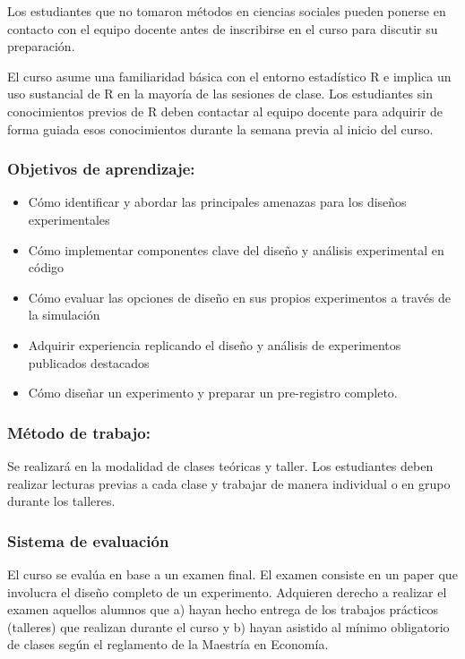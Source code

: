\documentclass[
  12pt,
]{article}
\providecommand{\tightlist}{%
  \setlength{\itemsep}{0pt}\setlength{\parskip}{0pt}}
\begin{document}
Los estudiantes que no tomaron métodos en ciencias sociales pueden
ponerse en contacto con el equipo docente antes de inscribirse en el
curso para discutir su preparación.

El curso asume una familiaridad básica con el entorno estadístico R e
implica un uso sustancial de R en la mayoría de las sesiones de clase.
Los estudiantes sin conocimientos previos de R deben contactar al equipo
docente para adquirir de forma guiada esos conocimientos durante la
semana previa al inicio del curso.

\hypertarget{objetivos-de-aprendizaje}{%
\subsubsection{Objetivos de
aprendizaje:}\label{objetivos-de-aprendizaje}}

\begin{itemize}
\tightlist
\item
  Cómo identificar y abordar las principales amenazas para los diseños
  experimentales
\item
  Cómo implementar componentes clave del diseño y análisis experimental
  en código
\item
  Cómo evaluar las opciones de diseño en sus propios experimentos a
  través de la simulación
\item
  Adquirir experiencia replicando el diseño y análisis de experimentos
  publicados destacados
\item
  Cómo diseñar un experimento y preparar un pre-registro completo.
\end{itemize}

\hypertarget{muxe9todo-de-trabajo}{%
\subsubsection{Método de trabajo:}\label{muxe9todo-de-trabajo}}

Se realizará en la modalidad de clases teóricas y taller. Los
estudiantes deben realizar lecturas previas a cada clase y trabajar de
manera individual o en grupo durante los talleres.

\hypertarget{sistema-de-evaluaciuxf3n}{%
\subsubsection{Sistema de evaluación}\label{sistema-de-evaluaciuxf3n}}

El curso se evalúa en base a un examen final. El examen consiste en un
paper que involucra el diseño completo de un experimento. Adquieren
derecho a realizar el examen aquellos alumnos que a) hayan hecho entrega
de los trabajos prácticos (talleres) que realizan durante el curso y b)
hayan asistido al mínimo obligatorio de clases según el reglamento de la
Maestría en Economía.
\end{document}
